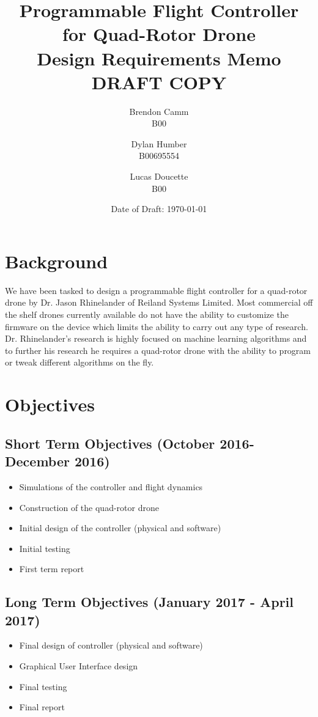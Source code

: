 \documentclass[draft]{article}
\title{Programmable Flight Controller for Quad-Rotor Drone \\ Design Requirements Memo \\ DRAFT COPY}
\author{Brendon Camm \\ B00 \and Dylan Humber \\ B00695554	\and Lucas Doucette \\ B00}
\date{Date of Draft: \today}
\begin{document}
\maketitle

\section{Background}
We have been tasked to design a programmable flight controller for a quad-rotor drone by Dr. Jason Rhinelander of Reiland Systems Limited. Most commercial off the shelf drones currently available do not have the ability to customize the firmware on the device which limits the ability to carry out any type of research. Dr. Rhinelander’s research is highly focused on machine learning algorithms and to further his research he requires a quad-rotor drone with the ability to program or tweak different algorithms on the fly. 
\section{Objectives}
\subsection{Short Term Objectives (October 2016-December 2016)}
\begin{itemize}
	\item Simulations of the controller and flight dynamics 
	\item Construction of the quad-rotor drone
	\item Initial design of the controller (physical and software)
	\item Initial testing
	\item First term report
\end{itemize}
\subsection{Long Term Objectives (January 2017 - April 2017)}
\begin{itemize}
	\item Final design of controller (physical and software)
	\item Graphical User Interface design
	\item Final testing 
	\item Final report
\end{itemize}
\end{document}
